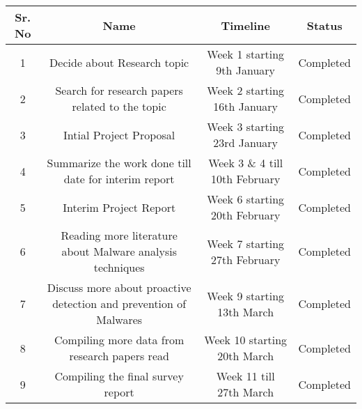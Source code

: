 \documentclass[11pt]{article}
\begin{document}
	\begin{table}
		\centering
		\begin{tabular}{cccc}
			\hline
			Sr. No & Name & Timeline & Status\\
			\hline
			1 & Decide about Research topic  & Week 1 starting 9th January & Completed\\
			\hline
			2 & Search for research papers related to the topic & Week 2 starting 16th January & Completed\\
			\hline
			3 & Intial Project Proposal & Week 3 starting 23rd January & Completed\\
			\hline
			4 & Summarize the work done till date for interim report & Week 3 \& 4 till 10th February & Completed\\
			\hline
			5 & Interim Project Report  & Week 6 starting 20th February  & Completed\\
			\hline
			6 & Reading more literature about Malware analysis techniques & Week 7 starting 27th February & Completed\\
			\hline
			7 & Discuss more about proactive detection and prevention of Malwares & Week 9 starting 13th March & Completed\\
			\hline
			8 & Compiling more data from research papers read & Week 10 starting 20th March & Completed\\
			\hline
			9 & Compiling the final survey report & Week 11 till 27th March & Completed\\
			\hline
		\end{tabular}
	\label{tab:timeline}
	\end{table}
	
	
	\begin{landscape}
	\end{landscape}


\end{document}
